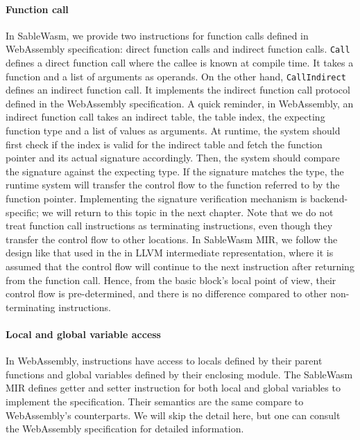 \paragraph{Function call}
In SableWasm, we provide two instructions for function calls defined in
WebAssembly specification: direct function calls and indirect function calls.
\texttt{Call} defines a direct function call where the callee is known at
compile time. It takes a function and a list of arguments as operands. On the
other hand, \texttt{CallIndirect} defines an indirect function call. It
implements the indirect function call protocol defined in the WebAssembly
specification. A quick reminder, in WebAssembly, an indirect function call takes
an indirect table, the table index, the expecting function type and a list of
values as arguments. At runtime, the system should first check if the index is
valid for the indirect table and fetch the function pointer and its actual
signature accordingly. Then, the system should compare the signature against the
expecting type. If the signature matches the type, the runtime system will
transfer the control flow to the function referred to by the function pointer.
Implementing the signature verification mechanism is backend-specific; we will
return to this topic in the next chapter. Note that we do not treat function
call instructions as terminating instructions, even though they transfer the
control flow to other locations. In SableWasm MIR, we follow the design like
that used in the in LLVM intermediate representation, where it is assumed that
the control flow will continue to the next instruction after returning from the
function call. Hence, from the basic block's local point of view, their control
flow is pre-determined, and there is no difference compared to other
non-terminating instructions.

\paragraph{Local and global variable access}
In WebAssembly, instructions have access to locals defined by their parent
functions and global variables defined by their enclosing module. The SableWasm
MIR defines getter and setter instruction for both local and global variables to
implement the specification. Their semantics are the same compare to
WebAssembly's counterparts. We will skip the detail here, but one can consult
the WebAssembly specification for detailed information.

